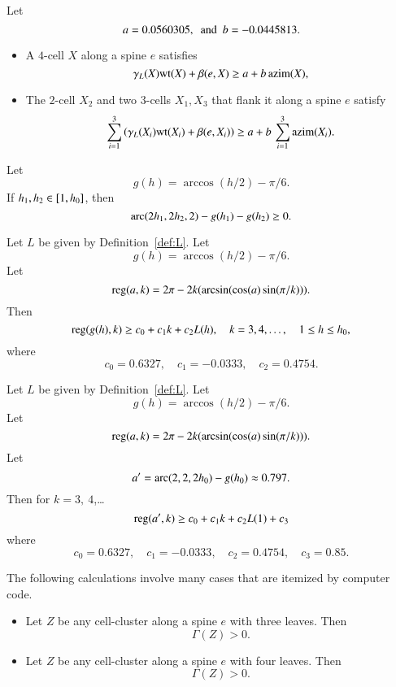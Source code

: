 \begin{calculation}\label{calc:cc:5bl}\cutrate{}
Let
\[ 
a= 0.0560305, \text{ \ and \ }   b= -0.0445813.
\] 
\begin{itemize}\wasitemize 
\item {} A $4$-cell $X$ along a spine $e$ satisfies
\[ 
\gamma_L(X){\operatorname{wt}}(X) + \beta(e,X) \ge a + b\,{\operatorname{azim}}(X),
\] 
\item {} The $2$-cell $X_2$ and two $3$-cells $X_1,X_3$
that flank it along a spine $e$ satisfy
\[ 
\sum_{i=1}^3 \left(\gamma_L(X_i){\operatorname{wt}}(X_i) + \beta(e,X_i)\right)\ge a + b\,\sum_{i=1}^3{\operatorname{azim}}(X_i).
\] 
\end{itemize}\wasitemize 
\end{calculation}

\begin{calculation}\label{calc:cc:disks}\cutrate{} 
Let
\[ 
g(h) = \arccos(h/2) - \pi/6.
\] 
If $h_1,h_2\in [1,{h_0}]$, then
\[ 
{\operatorname{arc}}(2h_1,2h_2,2) - g(h_1) - g(h_2)\ge 0.
\] 
\end{calculation}

\begin{calculation}\label{calc:cc:alin}\cutrate{}
Let $L$ be given by Definition~\ref{def:L}.
Let
\[ 
g(h) = \arccos(h/2) - \pi/6.
\] 
Let
\[ 
{\operatorname{reg}}(a,k) = 2\pi - 2 k (\arcsin(\cos(a)\sin(\pi/k))).
\] 
Then
\[ 
{\operatorname{reg}}(g(h),k) \ge c_0 + c_1 k + c_2 L(h),\quad
k = 3,4,\ldots,\quad 1\le h\le {h_0},
\] 
where
\[ c_0 = 0.6327,\quad c_1 = -0.0333,\quad c_2 =
0.4754.\] 
\end{calculation}

\begin{calculation}\label{calc:cc:alin2}\cutrate{}
Let $L$ be given by Definition~\ref{def:L}.
Let
\[ 
g(h) = \arccos(h/2) - \pi/6.
\] 
Let
\[ 
{\operatorname{reg}}(a,k) = 2\pi - 2 k (\arcsin(\cos(a)\sin(\pi/k))).
\] 
Let
\[ a'=\operatorname{arc}(2,2,2{h_0})-g({h_0}) \approx
0.797.\]  Then for $k=3,~4$,\dots
\[ {\operatorname{reg}}(a',k) \ge c_0 + c_1 k + c_2 L(1) +
c_3\] 
where 
\[ c_0 = 0.6327,\quad c_1 = -0.0333,\quad c_2 =
0.4754,\quad c_3 = 0.85.\] 
\end{calculation}

\begin{calculation}\label{calc:shorts}\cutrate{}
The following calculations involve many cases that are itemized by
computer code.
\begin{itemize}\wasitemize 
\item {} Let $Z$ be any cell-cluster along a spine $e$
with three leaves.  Then
\[ 
\Gamma(Z)> 0.
\] 
\item {} Let $Z$ be any cell-cluster along a spine $e$
with four leaves.  Then
\[ 
\Gamma(Z)> 0.
\] 
\end{itemize}\wasitemize 
\end{calculation}



